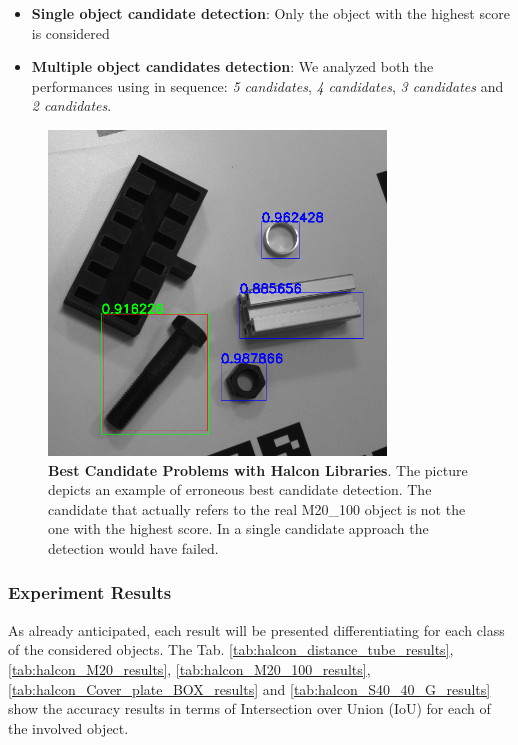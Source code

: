\begin{itemize}
	\item \textbf{Single object candidate detection}: Only the object with the highest score is considered
	\item \textbf{Multiple object candidates detection}: We analyzed both the performances using in sequence: \emph{5 candidates}, \emph{4 candidates}, \emph{3 candidates} and \emph{2 candidates}.
\end{itemize}

\begin{figure}
    \centering
    \includegraphics[width=0.8\textwidth]{figures/4_experiments/m20_100_halcon_detection_problems}
    \caption{\textbf{Best Candidate Problems with Halcon Libraries}. The picture depicts an example of erroneous best candidate detection. The candidate that actually refers to the real M20\_100 object is not the one with the highest score. In a single candidate approach the detection would have failed.}
    \label{fig:m20_100_halcon_detection_problems}
\end{figure}

\subsubsection{Experiment Results}
As already anticipated, each result will be presented differentiating for each class of the considered objects. The Tab. \ref{tab:halcon_distance_tube_results}, \ref{tab:halcon_M20_results}, \ref{tab:halcon_M20_100_results}, \ref{tab:halcon_Cover_plate_BOX_results} and \ref{tab:halcon_S40_40_G_results} show the accuracy results in terms of Intersection over Union (IoU) for each of the involved object.

